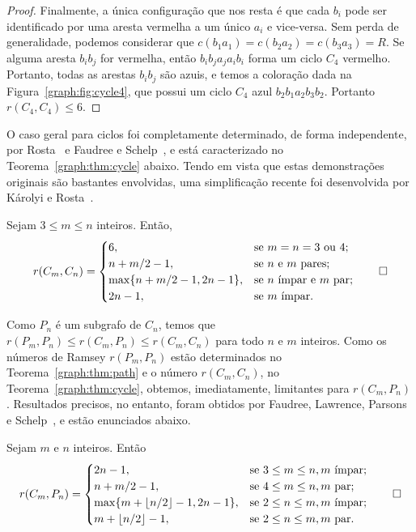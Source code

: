 \begin{proof}
Finalmente, a única configuração que nos resta é que cada $b_i$ pode ser identificado por uma aresta vermelha a um único $a_i$ e vice-versa. Sem perda de generalidade, podemos considerar que $c(b_1 a_1) = c(b_2 a_2) = c(b_3 a_3) = R$. Se alguma aresta $b_i b_j$ for vermelha, então $b_i b_j a_j a_i b_i$ forma um ciclo $C_4$ vermelho. Portanto, todas as arestas $b_i b_j$ são azuis, e temos a coloração dada na Figura~\ref{graph:fig:cycle4}, que possui um ciclo $C_4$ azul $b_2 b_1 a_2 b_3 b_2$. Portanto $r(C_4,C_4) \leq 6$.
\end{proof}

O caso geral para ciclos foi completamente determinado, de forma independente, por Rosta~\cite{rosta1973ramsey} e Faudree e Schelp~\cite{faudree1974all}, e está caracterizado no Teorema~\ref{graph:thm:cycle} abaixo. Tendo em vista que estas demonstrações originais são bastantes envolvidas, uma simplificação recente foi desenvolvida por Károlyi e Rosta~\cite{karolyi2001generalized}.

\begin{noprooftheorem}
\label{graph:thm:cycle}
Sejam $3 \leq m \leq n$ inteiros. Então,
\[r(C_m, C_n) = \begin{cases}
  6, & \text{se }m = n = 3 \text{ ou } 4;\\
  n + m/2 - 1, & \text{se }  n \text{ e } m \text{ pares}; \\
  \max\{n + m/2 - 1, 2n - 1\}, & \text{se } n \text{ ímpar e } m \text{ par};\\
  2n - 1 , & \text{se } m \text{ ímpar}.
\end{cases} \qedhere \]
\end{noprooftheorem}

Como $P_n$ é um subgrafo de $C_n$, temos que $r(P_m, P_n) \leq r(C_m, P_n) \leq r(C_m, C_n)$ para todo $n$ e $m$ inteiros. Como os números de Ramsey $r(P_m, P_n)$ estão determinados no Teorema~\ref{graph:thm:path} e o número $r(C_m, C_n)$, no Teorema~\ref{graph:thm:cycle}, obtemos, imediatamente, limitantes para $r(C_m, P_n)$. Resultados precisos, no entanto, foram obtidos por Faudree, Lawrence, Parsons e Schelp~\cite{faudree1974path}, e estão enunciados abaixo.

\begin{noprooftheorem}
\label{graph:thm:pathcycle}
Sejam $m$ e $n$ inteiros. Então
\[r(C_m, P_n) = \begin{cases}
  2n - 1, & \text{se }3 \leq m \leq n, m \text{ ímpar};\\
  n + m/2 - 1, & \text{se }4 \leq m \leq n, m \text{ par}; \\
  \max\{m + \lfloor n/2 \rfloor - 1, 2n - 1\}, & \text{se } 2 \leq n \leq m, m \text{ ímpar};\\
  m + \lfloor n/2 \rfloor -1 , & \text{se } 2 \leq n \leq m, m \text{ par}.
\end{cases} \qedhere\]
\end{noprooftheorem}

